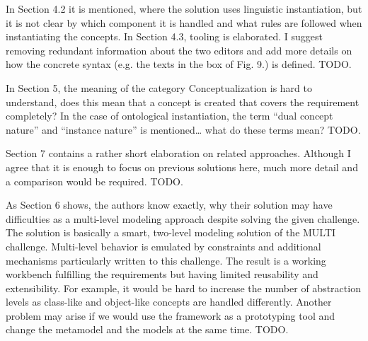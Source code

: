 \documentclass[10pt]{article}
\begin{document}
\begin{response}{In Section 4.2 it is mentioned, where the solution uses linguistic instantiation, but it is not clear by which component it is handled and what rules are followed when instantiating the concepts. In Section 4.3, tooling is elaborated. I suggest removing redundant information about the two editors and add more details on how the concrete syntax (e.g. the texts in the box of Fig. 9.) is defined.} 
TODO.
\end{response}

\begin{response}{In Section 5, the meaning of the category Conceptualization is hard to understand, does this mean that a concept is created that covers the requirement completely? In the case of ontological instantiation, the term “dual concept nature” and “instance nature” is mentioned… what do these terms mean?} 
TODO.
\end{response}

\begin{response}{Section 7 contains a rather short elaboration on related approaches. Although I agree that it is enough to focus on previous solutions here, much more detail and a comparison would be required.} 
TODO.
\end{response}

\begin{response}{As Section 6 shows, the authors know exactly, why their solution may have difficulties as a multi-level modeling approach despite solving the given challenge. The solution is basically a smart, two-level modeling solution of the MULTI challenge. Multi-level behavior is emulated by constraints and additional mechanisms particularly written to this challenge. The result is a working workbench fulfilling the requirements but having limited reusability and extensibility. For example, it would be hard to increase the number of abstraction levels as class-like and object-like concepts are handled differently. Another problem may arise if we would use the framework as a prototyping tool and change the metamodel and the models at the same time.} 
TODO.
\end{response}
\end{document}
